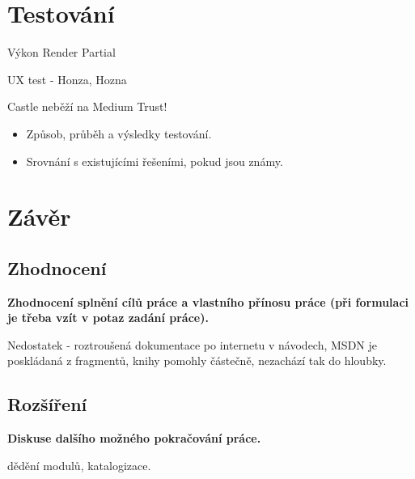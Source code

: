 \documentclass[11pt,twoside,a4paper]{book}
\begin{document}
\chapter{Testování}
\label{sec:testovani}

Výkon Render Partial

UX test - Honza, Hozna

Castle neběží na Medium Trust!


\begin{itemize}
 \item Způsob, průběh a výsledky testování.
 \item Srovnání s existujícími řešeními, pokud jsou známy.
\end{itemize} 


\chapter{Závěr}
\label{sec:zaver}



\section{Zhodnocení}
\textbf{Zhodnocení splnění cílů práce a vlastního přínosu práce (při formulaci je třeba vzít v potaz zadání práce).}

Nedostatek - roztroušená dokumentace po internetu v návodech, MSDN je poskládaná z fragmentů, knihy pomohly částečně, nezachází tak do hloubky.

\section{Rozšíření}
\textbf{Diskuse dalšího možného pokračování práce. }

dědění modulů, katalogizace.



%

\end{document}
